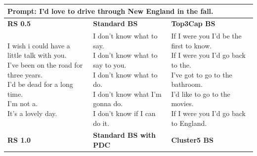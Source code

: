\begin{table}[t]
    \small
    \begin{tabular}{|l|l|l|}
    \hline
    \multicolumn{3}{|l|}{\rule{0pt}{0.35cm} \textbf{Prompt:} I'd love to drive through New England in the fall.}  \\ 
    \hline \hline
    \textbf{RS 0.5} &  \textbf{Standard BS} &  \textbf{Top3Cap BS} \\
    \hline
\makecell[l]{
I wish i could have a little talk with you.\\
I've been on the road for three years.\\
I'd be dead for a long time.\\
I'm not a.\\
It's a lovely day.\\
}&
\makecell[l]{
I don't know what to say.\\
I don't know what to say to you.\\
I don't know what to do.\\
I don't know what I'm gonna do.\\
I don't know if I can do it.\\
}&
\makecell[l]{
If I were you I'd be the first to know.\\
If I were you I'd go back to the.\\
I've got to go to the bathroom.\\
I'd like to go to the movies.\\
If I were you I'd go back to England.\\
}
 \\
    \hline
    \hline
    \textbf{RS 1.0} & \textbf{Standard BS with PDC} &  \textbf{Cluster5 BS} \\
    \hline
    

\end{tabular}
\end{table}
